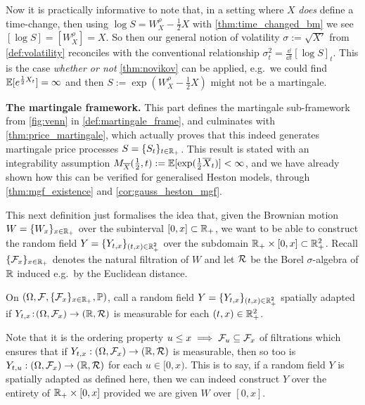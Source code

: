 Now it is practically informative to note that, in a setting where $X$ \emph{does} define a time-change, then using $\log S = W^\rho_X-\frac12 X$ with \autoref{thm:time_changed_bm} we see $[\log S] = [W^\rho_X] = X$. So then our general notion of volatility $\sigma:=\sqrt{X'}$ from \autoref{def:volatility} reconciles with the conventional relationship $\sigma^2_t=\frac{\dd}{\dd t}[\log S]_t$. This is the case \emph{whether or not} \autoref{thm:novikov} can be applied, e.g.~we could find $\mathbb{E}[e^{\frac12 X_t}]=\infty$ and then $S := \exp(W^\rho_X-\frac12 X)$ might not be a martingale.

\vspace{3mm}\textbf{The martingale framework.} This part defines the martingale sub-framework from \autoref{fig:venn} in \autoref{def:martingale_frame}, and culminates with \autoref{thm:price_martingale}, which actually proves that this indeed generates martingale price processes $S=\{S_t\}_{t\in\mathbb{R}_+}$. This result is stated with an integrability assumption $M_{{\overline{X}}}(\frac12,t):=\mathbb{E}[\exp(\frac12 {\overline{X}}_t)]<\infty$, and we have already shown how this can be verified for generalised Heston models, through \autoref{thm:mgf_existence} and \autoref{cor:gauss_heston_mgf}.

This next definition just formalises the idea that, given the Brownian motion $W=\{W_x\}_{x\in\mathbb{R}_+}$ over the subinterval $[0,x]\subset\mathbb{R}_+$, we want to be able to construct the random field $Y=\{Y_{t,x}\}_{(t,x)\in\mathbb{R}_+^2}$ over the subdomain $\mathbb{R}_+\times[0,x]\subset\mathbb{R}_+^2$. Recall $\{\mathcal{F}_x\}_{x\in\mathbb{R}_+}$ denotes the natural filtration of $W$ and let $\mathcal{R}$ be the Borel $\sigma$-algebra of $\mathbb{R}$ induced e.g.~by the Euclidean distance.

\begin{definition}\label{def:spatial_adapted}
    On $(\Omega,\mathcal{F},\{\mathcal{F}_x\}_{x\in\mathbb{R}_+},\mathbb{P})$, call a random field $Y=\{Y_{t,x}\}_{(t,x)\in\mathbb{R}_+^2}$ spatially adapted if $Y_{t,x}\!:\!(\Omega,\mathcal{F}_x)\to(\mathbb{R},\mathcal{R})$ is measurable for each $(t,x)\in\mathbb{R}^2_+$.
\end{definition}

Note that it is the ordering property $u\le x\implies\mathcal{F}_u\subseteq\mathcal{F}_x$ of filtrations which ensures that if $Y_{t,x}:(\Omega,\mathcal{F}_x)\to(\mathbb{R},\mathcal{R})$ is measurable, then so too is $Y_{t,u}:(\Omega,\mathcal{F}_x)\to(\mathbb{R},\mathcal{R})$ for each $u\in[0,x)$. This is to say, if a random field $Y$ is spatially adapted as defined here, then we can indeed construct $Y$ over the entirety of $\mathbb{R}_+\times[0,x]$ provided we are given $W$ over $[0,x]$.

